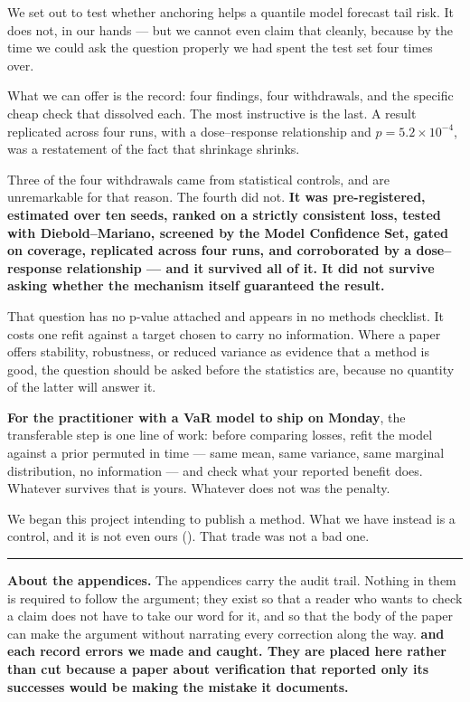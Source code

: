 We set out to test whether anchoring helps a quantile model forecast tail risk. It does not, in
our hands --- but we cannot even claim that cleanly, because by the time we could ask the
question properly we had spent the test set four times over.

What we can offer is the record: four findings, four withdrawals, and the specific cheap check
that dissolved each. The most instructive is the last. A result replicated across four runs,
with a dose--response relationship and \(p = 5.2 \times 10^{-4}\), was a restatement of the fact that shrinkage
shrinks.

Three of the four withdrawals came from statistical controls, and are unremarkable for that
reason. The fourth did not. \textbf{It was pre-registered, estimated over ten seeds, ranked on a
strictly consistent loss, tested with Diebold--Mariano, screened by the Model Confidence Set,
gated on coverage, replicated across four runs, and corroborated by a dose--response
relationship --- and it survived all of it. It did not survive asking whether the mechanism itself
guaranteed the result.}

That question has no p-value attached and appears in no methods checklist. It costs one refit
against a target chosen to carry no information. Where a paper offers stability, robustness, or
reduced variance as evidence that a method is good, the question should be asked before the
statistics are, because no quantity of the latter will answer it.

\textbf{For the practitioner with a VaR model to ship on Monday}, the transferable step is one line
of work: before comparing losses, refit the model against a prior permuted in time --- same mean,
same variance, same marginal distribution, no information --- and check what your reported benefit
does. Whatever survives that is yours. Whatever does not was the penalty.

We began this project intending to publish a method. What we have instead is a control, and it
is not even ours (). That trade was not a bad one.

\begin{center}\rule{0.5\linewidth}{0.5pt}\end{center}

\textbf{About the appendices.} The appendices carry the audit trail. Nothing in them is required to follow the argument; they
exist so that a reader who wants to check a claim does not have to take our word for it, and so
that the body of the paper can make the argument without narrating every correction along the
way. \textbf{ and  each record errors we made and caught. They are placed here
rather than cut because a paper about verification that reported only its successes would be
making the mistake it documents.}
